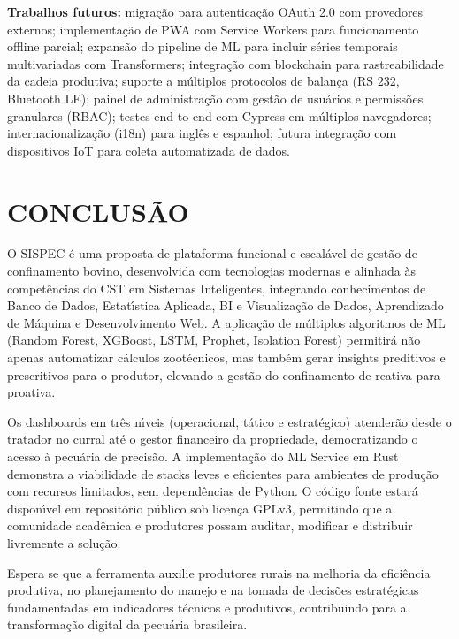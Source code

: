 \documentclass[12pt,a4paper]{article}
\begin{document}
\textbf{Trabalhos futuros:} migra\c c\~ao para autentica\c c\~ao OAuth 2.0 com provedores externos; implementa\c c\~ao de PWA com Service Workers para funcionamento offline parcial; expans\~ao do pipeline de ML para incluir s\'eries temporais multivariadas com Transformers; integra\c c\~ao com blockchain para rastreabilidade da cadeia produtiva; suporte a m\'ultiplos protocolos de balan\c ca (RS 232, Bluetooth LE); painel de administra\c c\~ao com gest\~ao de usu\'arios e permiss\~oes granulares (RBAC); testes end to end com Cypress em m\'ultiplos navegadores; internacionaliza\c c\~ao (i18n) para ingl\^es e espanhol; futura integra\c c\~ao com dispositivos IoT para coleta automatizada de dados.

\section{CONCLUS\~AO}

O SISPEC \'e uma proposta de plataforma funcional e escal\'avel de gest\~ao de confinamento bovino, desenvolvida com tecnologias modernas e alinhada \`as compet\^encias do CST em Sistemas Inteligentes, integrando conhecimentos de Banco de Dados, Estat\'{\i}stica Aplicada, BI e Visualiza\c c\~ao de Dados, Aprendizado de M\'aquina e Desenvolvimento Web. A aplica\c c\~ao de m\'ultiplos algoritmos de ML (Random Forest, XGBoost, LSTM, Prophet, Isolation Forest) permitir\'a n\~ao apenas automatizar c\'alculos zoot\'ecnicos, mas tamb\'em gerar insights preditivos e prescritivos para o produtor, elevando a gest\~ao do confinamento de reativa para proativa.

Os dashboards em tr\^es n\'{\i}veis (operacional, t\'atico e estrat\'egico) atender\~ao desde o tratador no curral at\'e o gestor financeiro da propriedade, democratizando o acesso \`a pecu\'aria de precis\~ao. A implementa\c c\~ao do ML Service em Rust demonstra a viabilidade de stacks leves e eficientes para ambientes de produ\c c\~ao com recursos limitados, sem depend\^encias de Python. O c\'odigo fonte estar\'a dispon\'{\i}vel em reposit\'orio p\'ublico sob licen\c ca GPLv3, permitindo que a comunidade acad\^emica e produtores possam auditar, modificar e distribuir livremente a solu\c c\~ao.

Espera se que a ferramenta auxilie produtores rurais na melhoria da efici\^encia produtiva, no planejamento do manejo e na tomada de decis\~oes estrat\'egicas fundamentadas em indicadores t\'ecnicos e produtivos, contribuindo para a transforma\c c\~ao digital da pecu\'aria brasileira.
\end{document}

